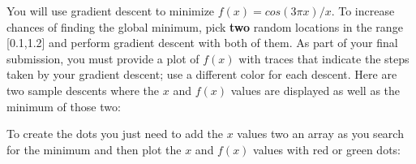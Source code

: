 \begin{fullwidth}
You will use gradient descent to minimize $f(x) = cos(3\pi x) / x$. To increase chances of finding the global minimum, pick {\bf two} random locations in the range [0.1,1.2] and perform gradient descent with both of them. As part of your final submission, you must provide a plot of $f(x)$ with traces that indicate the steps taken by your gradient descent; use a different color for each descent. Here are two sample descents where the $x$ and $f(x)$ values are displayed as well as the minimum of those two:

\noindent {}

To create the dots you just need to add the $x$ values two an array as you search for the minimum and then plot the $x$ and $f(x)$ values with red or green dots:


\end{fullwidth}
